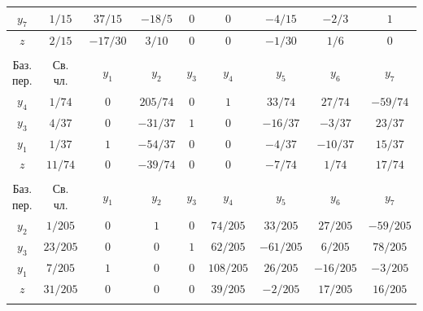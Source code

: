 \documentclass[a4paper,14pt]{extarticle}
\begin{document}
\begin{center}
\begin{longtable}{|c|c|c|c|c|c|c|c|c|}
        \hline
        $y_7$     & $1/15$        & $37/15$     & $-18/5$      & $0$      & $0$        & $-4/15$      & $-2/3$   & $1$       \\
        \hline
        $z$      & $2/15$        & $-17/30$     & $3/10$     & $0$     & $0$       & $-1/30$       & $1/6$   & $0$       \\
        \hline
        \multicolumn{9}{c}{}                                                                                 \\
        \hline
        Баз. пер. & Св. чл.    & $y_1$    & $y_2$    & $y_3$    & $y_4 $     & $y_5$     & $y_6$ & $y_7$     \\
        \hline
        $y_4$     & $1/74$        & $0$      & $205/74$      & $0$      & $1$        & $33/74$      & $27/74$   & $-59/74$       \\
        \hline
        $y_3$     & $4/37$        & $0$     & $-31/37$      & $1$      & $0$        & $-16/37$      & $-3/37$   & $23/37$       \\
        \hline
        $y_1$     & $1/37$        & $1$     & $-54/37$      & $0$      & $0$        & $-4/37$      & $-10/37$   & $15/37$       \\
        \hline
        $z$      & $11/74$        & $0$     & $-39/74$     & $0$     & $0$       & $-7/74$       & $1/74$   & $17/74$ \\
        \hline
        \multicolumn{9}{c}{}                                                                                 \\
        \hline
        Баз. пер. & Св. чл.    & $y_1$    & $y_2$    & $y_3$    & $y_4 $     & $y_5$     & $y_6$ & $y_7$     \\
        \hline
        $y_2$     & $1/205$        & $0$      & $1$      & $0$      & $74/205$        & $33/205$      & $27/205$   & $-59/205$       \\
        \hline
        $y_3$     & $23/205$        & $0$     & $0$      & $1$      & $62/205$        & $-61/205$      & $6/205$   & $78/205$       \\
        \hline
        $y_1$     & $7/205$        & $1$     & $0$      & $0$      & $108/205$        & $26/205$      & $-16/205$   & $-3/205$       \\
        \hline
        $z$      & $31/205$        & $0$     & $0$     & $0$     & $39/205$       & $-2/205$       & $17/205$   & $16/205$ \\
        \hline
        \multicolumn{9}{c}{}                                                                                 \\

\end{longtable}
\end{center}
\end{document}

